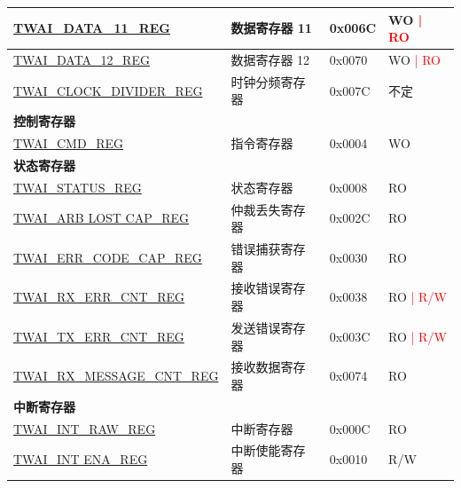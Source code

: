 \begin{longtable}{ | p{6cm} | p{6cm} | p{1.3cm} | p{2cm} | }
\hyperref[regdesc:TWAIDATA11REG]{TWAI\_DATA\_11\_REG} & 数据寄存器 11 & 0x006C & WO \textcolor{red}{| RO} \\ \hline
\hyperref[regdesc:TWAIDATA12REG]{TWAI\_DATA\_12\_REG} & 数据寄存器 12 & 0x0070 & WO \textcolor{red}{| RO} \\ \hline
\hyperref[regdesc:TWAICLOCKDIVIDERREG]{TWAI\_CLOCK\_DIVIDER\_REG} & 时钟分频寄存器 & 0x007C & 不定 \\ \hline
\multicolumn{4}{|l|}{\textbf{控制寄存器}} \\ \hline
\hyperref[regdesc:TWAICMDREG]{TWAI\_CMD\_REG} & 指令寄存器 & 0x0004 & WO \\ \hline
\multicolumn{4}{|l|}{\textbf{状态寄存器}} \\ \hline
\hyperref[regdesc:TWAISTATUSREG]{TWAI\_STATUS\_REG} & 状态寄存器 & 0x0008 & RO \\ \hline
\hyperref[regdesc:TWAIARB LOST CAPREG]{TWAI\_ARB LOST CAP\_REG} & 仲裁丢失寄存器 & 0x002C & RO \\ \hline
\hyperref[regdesc:TWAIERRCODECAPREG]{TWAI\_ERR\_CODE\_CAP\_REG} & 错误捕获寄存器 & 0x0030 & RO \\ \hline
\hyperref[regdesc:TWAIRXERRCNTREG]{TWAI\_RX\_ERR\_CNT\_REG} & 接收错误寄存器 & 0x0038 & RO \textcolor{red}{| R/W} \\ \hline
\hyperref[regdesc:TWAITXERRCNTREG]{TWAI\_TX\_ERR\_CNT\_REG} & 发送错误寄存器 & 0x003C & RO \textcolor{red}{| R/W} \\ \hline
\hyperref[regdesc:TWAIRXMESSAGECNTREG]{TWAI\_RX\_MESSAGE\_CNT\_REG} & 接收数据寄存器 & 0x0074 & RO \\ \hline
\multicolumn{4}{|l|}{\textbf{中断寄存器}} \\ \hline
\hyperref[regdesc:TWAIINTRAWREG]{TWAI\_INT\_RAW\_REG} & 中断寄存器 & 0x000C & RO \\ \hline
\hyperref[regdesc:TWAIINT ENAREG]{TWAI\_INT ENA\_REG} & 中断使能寄存器 & 0x0010 & R/W \\ \hline
\end{longtable}
